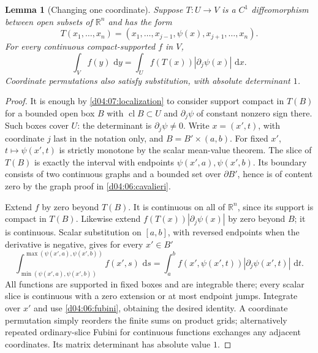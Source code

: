 \documentclass[11pt,oneside,openany]{book}
\newtheorem{lemma}[theorem]{Lemma}
\theoremstyle{definition}
\theoremstyle{remark}
\newcommand{\R}{\mathbb R}
\newcommand{\dd}{\,\mathrm d}
\DeclareMathOperator{\cl}{cl}
\begin{document}
\begin{lemma}[Changing one coordinate]\label{d04:07:one-coordinate}
Suppose $T:U\to V$ is a $C^1$ diffeomorphism between open subsets of $\R^n$ and has the form
\[
 T(x_1,\ldots,x_n)=(x_1,\ldots,x_{j-1},\psi(x),x_{j+1},\ldots,x_n).
\]
For every continuous compact-supported $f$ in $V$,
\[
 \int_Vf(y)\,\dd y=\int_U f(T(x))|\partial_j\psi(x)|\,\dd x.
\]
Coordinate permutations also satisfy substitution, with absolute determinant $1$.
\end{lemma}
\begin{proof}
It is enough by \cref{d04:07:localization} to consider support compact in $T(B)$ for a bounded open box $B$ with $\cl B\subset U$ and $\partial_j\psi$ of constant nonzero sign there. Such boxes cover $U$: the determinant is $\partial_j\psi\ne0$. Write $x=(x',t)$, with coordinate $j$ last in the notation only, and $B=B'\times(a,b)$. For fixed $x'$, $t\mapsto\psi(x',t)$ is strictly monotone by the scalar mean-value theorem. The slice of $T(B)$ is exactly the interval with endpoints $\psi(x',a),\psi(x',b)$. Its boundary consists of two continuous graphs and a bounded set over $\partial B'$, hence is of content zero by the graph proof in \cref{d04:06:cavalieri}.

Extend $f$ by zero beyond $T(B)$. It is continuous on all of $\R^n$, since its support is compact in $T(B)$. Likewise extend $f(T(x))|\partial_j\psi(x)|$ by zero beyond $B$; it is continuous. Scalar substitution on $[a,b]$, with reversed endpoints when the derivative is negative, gives for every $x'\in B'$
\[
 \int_{\min(\psi(x',a),\psi(x',b))}^{\max(\psi(x',a),\psi(x',b))} f(x',s)\,\dd s
 =\int_a^b f(x',\psi(x',t))|\partial_j\psi(x',t)|\,\dd t.
\]
All functions are supported in fixed boxes and are integrable there; every scalar slice is continuous with a zero extension or at most endpoint jumps. Integrate over $x'$ and use \cref{d04:06:fubini}, obtaining the desired identity. A coordinate permutation simply reorders the finite sums on product grids; alternatively repeated ordinary-slice Fubini for continuous functions exchanges any adjacent coordinates. Its matrix determinant has absolute value $1$.
\end{proof}
\end{document}
